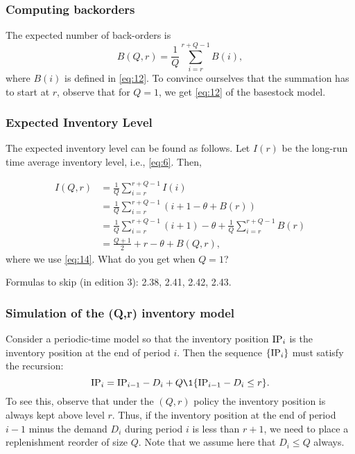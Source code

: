 \subsubsection{Computing  backorders}

The expected number of back-orders is 
\begin{equation}
  \label{eq:14}
   B(Q,r) = \frac1Q \sum_{i=r}^{r+Q-1} B(i),
\end{equation}
where $B(i)$ is defined in \eqref{eq:12}. To convince ourselves
that the summation has to start at $r$, observe that for
$Q=1$, we get \eqref{eq:12} of the basestock model.


\subsubsection{Expected Inventory Level}

The expected inventory level can be found as follows. Let $I(r)$
be the long-run time average inventory level, i.e., \eqref{eq:6}. Then,

\begin{equation*}
  \begin{split}
   I(Q,r)
   &= \frac1Q\sum_{i=r}^{r+Q-1} I(i) \\
   &= \frac1Q\sum_{i=r}^{r+Q-1} (i+1 - \theta + B(r)) \\
   &= \frac1Q\sum_{i=r}^{r+Q-1} (i + 1)  - \theta + \frac1Q\sum_{i=r}^{r+Q-1} B(r) \\
   &= \frac{Q+1}2 + r - \theta + B(Q,r), 
  \end{split}
\end{equation*}
where we use \eqref{eq:14}. What do you get when $Q=1$?

Formulas to skip (in edition 3): 2.38, 2.41, 2.42, 2.43.


\subsubsection{Simulation of the (Q,r) inventory model}

Consider a periodic-time model so that the inventory position $\textrm{IP}_i$
is the inventory position at the end of period $i$. Then the sequence
$\{\textrm{IP}_i\}$ must satisfy the recursion:
\begin{equation}
  \IP_i = \IP_{i-1} - D_i + Q \1{\IP_{i-1} - D_i\leq r}.
\end{equation}
To see this, observe that under the $(Q,r)$ policy the inventory
position is always kept above level $r$. Thus, if the inventory
position at the end of period $i-1$ minus the demand $D_i$ during
period $i$ is less than $r+1$, we need to place a replenishment
reorder of size $Q$.  Note that we assume here that $D_i\leq Q$ always.

